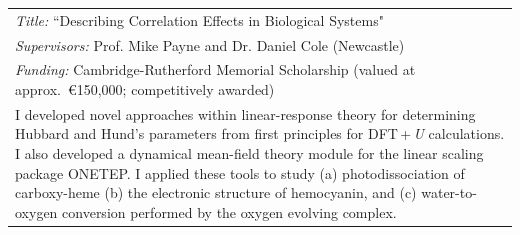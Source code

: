 \documentclass[10pt,a4paper,final]{article}
\begin{document}
\begin{tabularx}{\textwidth}{
   m{\dimexpr\textwidth-2\tabcolsep}}
   \cellcolor{seaborn_bg_grey}%
   \noindent \textit{Title:} ``Describing Correlation Effects in Biological Systems"
   \\
   \cellcolor{seaborn_bg_grey}%
   \textit{Supervisors:} Prof. Mike Payne and Dr. Daniel Cole (Newcastle)
   \\
   \cellcolor{seaborn_bg_grey}%
   \textit{Funding:} Cambridge-Rutherford Memorial Scholarship (valued at approx.\ \euro{}150,000; competitively awarded)
   \\
   \cellcolor{seaborn_bg_grey}%
   I developed novel approaches within linear-response theory for determining Hubbard and Hund's parameters from first principles for DFT\,+\,\emph{U} calculations. I also developed a dynamical mean-field theory module for the linear scaling package ONETEP. I applied these tools to study (a) photodissociation of carboxy-heme (b) the electronic structure of hemocyanin, and (c) water-to-oxygen conversion performed by the oxygen evolving complex.
   \\
\end{tabularx}
\end{document}
